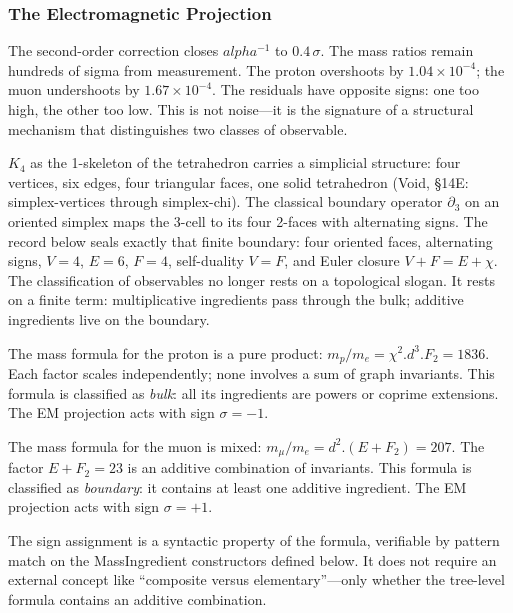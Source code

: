 \documentclass[11pt,a4paper]{book}
\def\alpha{alpha}%
\def\cdot{.}%
\def\texttt#1{#1}%
\begin{document}
\subsubsection*{The Electromagnetic Projection}

The second-order correction closes $\alpha^{-1}$ to $0.4\,\sigma$.  The mass
ratios remain hundreds of sigma from measurement.  The proton overshoots by
$1.04 \times 10^{-4}$; the muon undershoots by $1.67 \times 10^{-4}$.  The
residuals have opposite signs: one too high, the other too low.  This is not
noise---it is the signature of a structural mechanism that distinguishes two
classes of observable.

$K_4$ as the 1-skeleton of the tetrahedron carries a simplicial
structure: four vertices, six edges, four triangular faces, one
solid tetrahedron (Void, \S14E: simplex-vertices through simplex-chi).
The classical boundary operator $\partial_3$ on an oriented simplex
maps the 3-cell to its four 2-faces with alternating signs.
The record below seals exactly that finite boundary: four oriented
faces, alternating signs, $V = 4$, $E = 6$, $F = 4$, self-duality
$V = F$, and Euler closure $V + F = E + \chi$.  The classification of
observables no longer rests on a topological slogan. It rests on a
finite term: multiplicative ingredients pass through the bulk;
additive ingredients live on the boundary.

The mass formula for the proton is a pure product:
$m_p / m_e = \chi^2 \cdot d^3 \cdot F_2 = 1836$.  Each factor scales
independently; none involves a sum of graph invariants.  This formula
is classified as \emph{bulk}: all its ingredients are powers or coprime
extensions.  The EM projection acts with sign $\sigma = -1$.

The mass formula for the muon is mixed:
$m_\mu / m_e = d^2 \cdot (E + F_2) = 207$.  The factor $E + F_2 = 23$ is an
additive combination of invariants.  This formula is classified as
\emph{boundary}: it contains at least one additive ingredient.
The EM projection acts with sign $\sigma = +1$.

The sign assignment is a syntactic property of the formula, verifiable
by pattern match on the \texttt{MassIngredient} constructors defined
below.  It does not require an external concept like ``composite
versus elementary''---only whether the tree-level formula contains
an additive combination.
\end{document}
